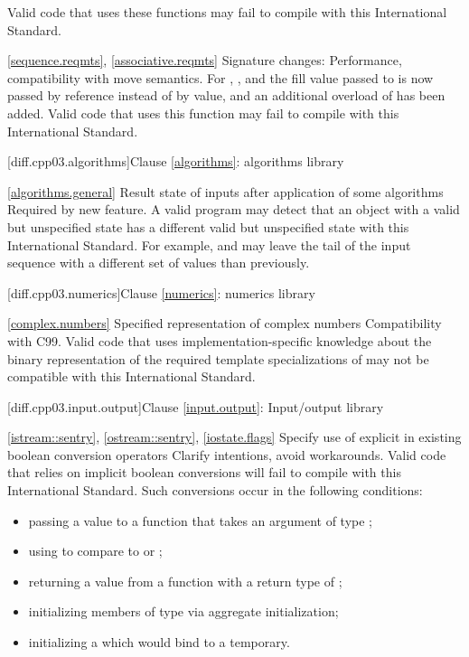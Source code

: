 Valid \CppIII code that uses these functions may fail to compile with this
International Standard.

\ref{sequence.reqmts}, \ref{associative.reqmts}
\change Signature changes: 
\rationale Performance, compatibility with move semantics.
\effect
For , , and 
the fill value passed to  is now passed by reference instead of
by value, and an additional overload of  has been added. Valid
\CppIII code that uses this function may fail to compile with this International
Standard.

[diff.cpp03.algorithms]{Clause \ref{algorithms}: algorithms library}

\ref{algorithms.general}
\change Result state of inputs after application of some algorithms
\rationale Required by new feature.
\effect
A valid \CppIII program may detect that an object with a valid but
unspecified state has a different valid but unspecified state with this
International Standard. For example,  and
 may leave the tail of the input sequence with a
different set of values than previously.

[diff.cpp03.numerics]{Clause \ref{numerics}: numerics library}

\ref{complex.numbers}
\change Specified representation of complex numbers
\rationale Compatibility with C99.
\effect
Valid \CppIII code that uses implementation-specific knowledge about the
binary representation of the required template specializations of
 may not be compatible with this International Standard.

[diff.cpp03.input.output]{Clause \ref{input.output}: Input/output library}

\ref{istream::sentry},
\ref{ostream::sentry},
\ref{iostate.flags}
\change Specify use of explicit in existing boolean conversion operators
\rationale Clarify intentions, avoid workarounds.
\effect
Valid \CppIII code that relies on implicit boolean conversions will fail to
compile with this International Standard. Such conversions occur in the
following conditions:

\begin{itemize}
\item passing a value to a function that takes an argument of type ;
\item using  to compare to  or ;
\item returning a value from a function with a return type of ;
\item initializing members of type  via aggregate initialization;
\item initializing a  which would bind to a temporary.
\end{itemize}

